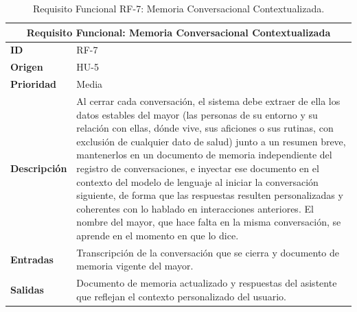 \begin{table}[htbp]
    \centering
    \renewcommand{\arraystretch}{1.3}
    \begin{tabular}{|l|>{\raggedright\arraybackslash}p{}|}
        \hline
        \multicolumn{2}{|c|}{\textbf{Requisito Funcional: Memoria Conversacional Contextualizada}} \\
        \hline
        \textbf{ID} & RF-7 \\
        \hline
        \textbf{Origen} & HU-5 \\
        \hline
        \textbf{Prioridad} & Media \\
        \hline
        \textbf{Descripción} & Al cerrar cada conversación, el sistema debe extraer de ella los datos
            estables del mayor (las personas de su entorno y su relación con ellas, dónde vive, sus
            aficiones o sus rutinas, con exclusión de cualquier dato de salud) junto a un resumen breve,
            mantenerlos en un documento de memoria independiente del registro de conversaciones, e inyectar
            ese documento en el contexto del modelo de lenguaje al iniciar la conversación siguiente, de forma
            que las respuestas resulten personalizadas y coherentes con lo hablado en interacciones
            anteriores. El nombre del mayor, que hace falta en la misma conversación, se aprende en el
            momento en que lo dice. \\
        \hline
        \textbf{Entradas} & Transcripción de la conversación que se cierra y documento de memoria vigente
            del mayor. \\
        \hline
        \textbf{Salidas} & Documento de memoria actualizado y respuestas del asistente que reflejan el
            contexto personalizado del usuario. \\
        \hline
    \end{tabular}
    \caption{Requisito Funcional RF-7: Memoria Conversacional Contextualizada.}
    \label{tab:rf7}
\end{table}

